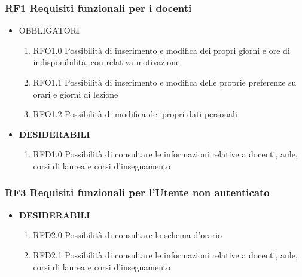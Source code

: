 \documentclass[11pt,a4paper]{article}
\begin{document}
\subsubsection{RF1 Requisiti funzionali per i docenti}
\begin{itemize}
\item \textsc{OBBLIGATORI}
\begin{enumerate}
\item RFO1.0 Possibilità di inserimento e modifica dei propri giorni e ore di indisponibilità, con relativa motivazione
\item RFO1.1 Possibilità di inserimento e modifica delle proprie preferenze su orari e giorni di lezione
\item RFO1.2 Possibilità di modifica dei propri dati personali
\end{enumerate}
\item \textbf{DESIDERABILI}
\begin{enumerate}
\item RFD1.0 Possibilità di consultare le informazioni relative a docenti, aule, corsi di laurea e corsi d'insegnamento
\end{enumerate}
\end{itemize}
\subsubsection{RF3 Requisiti funzionali per l'Utente non autenticato}
\begin{itemize}
\item \textbf{DESIDERABILI}
\begin{enumerate}
\item RFD2.0 Possibilità di consultare lo schema d'orario
\item RFD2.1 Possibilità di consultare le informazioni relative a docenti, aule, corsi di laurea e corsi d'insegnamento
\end{enumerate}
\end{itemize}
\end{document}
